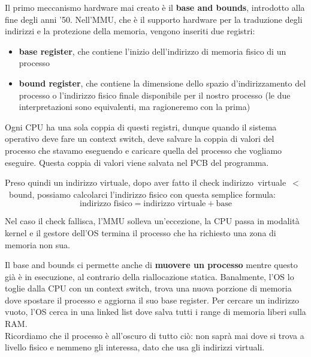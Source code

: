 \documentclass[11pt, a4paper, titlepage, oneside]{scrbook}
\begin{document}
Il primo meccanismo hardware mai creato è il \textbf{base and bounds}, introdotto alla fine degli anni '50. Nell'MMU, che è il supporto hardware per la traduzione degli indirizzi e la protezione della memoria, vengono inseriti due registri: 
\begin{itemize}
    \item \textbf{base register}, che contiene l'inizio dell'indirizzo di memoria fisico di un processo
    \item \textbf{bound register}, che contiene la dimensione dello spazio d'indirizzamento del processo o l'indirizzo fisico finale disponibile per il nostro processo (le due interpretazioni sono equivalenti, ma ragioneremo con la prima)
\end{itemize}

Ogni CPU ha una sola coppia di questi registri, dunque quando il sistema operativo deve fare un context switch, deve salvare la coppia di valori del processo che stavamo eseguendo e caricare quella del processo che vogliamo eseguire. Questa coppia di valori viene salvata nel PCB del programma.

Preso quindi un indirizzo virtuale, dopo aver fatto il check \mbox{indirizzo virtuale $<$ bound}, possiamo calcolarci l'indirizzo fisico con questa semplice formula:
\[
\text{indirizzo fisico} = \text{indirizzo virtuale} + \text{base}
\]

Nel caso il check fallisca, l'MMU solleva un'eccezione, la CPU passa in modalità kernel e il gestore dell'OS termina il processo che ha richiesto una zona di memoria non sua. 

Il base and bounds ci permette anche di \textbf{muovere un processo} mentre questo già è in esecuzione, al contrario della riallocazione statica. Banalmente, l'OS lo toglie dalla CPU con un context switch, trova una nuova porzione di memoria dove spostare il processo e aggiorna il suo base register. Per cercare un indirizzo vuoto, l'OS cerca in una linked list dove salva tutti i range di memoria liberi sulla RAM. \\
Ricordiamo che il processo è all'oscuro di tutto ciò: non saprà mai dove si trova a livello fisico e nemmeno gli interessa, dato che usa gli indirizzi virtuali.
\end{document}
